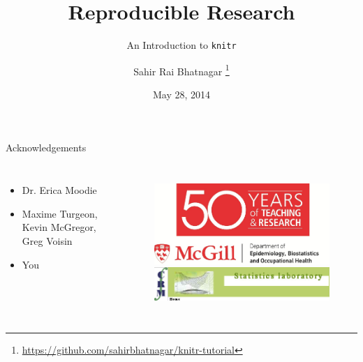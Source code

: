 \documentclass[10pt]{beamer}\usepackage[]{graphicx}\usepackage[]{color}
\begin{document}
\title[RR: Intro to \texttt{knitr}]{Reproducible Research}
\subtitle{An Introduction to \texttt{knitr}}

\author[]{Sahir Rai Bhatnagar%
\thanks{\href{https://github.com/sahirbhatnagar/knitr-tutorial}{https://github.com/sahirbhatnagar/knitr-tutorial}%
}}

\date{May 28, 2014}


\maketitle

\begin{frame}{Acknowledgements}
\begin{columns}[c] %


\begin{itemize}
\item Dr. Erica Moodie
\item Maxime Turgeon, Kevin McGregor, Greg Voisin
\item You
\end{itemize}

\begin{figure}
\includegraphics[width=0.6\columnwidth]{eboh50.pdf}\\[5mm]
\includegraphics[width=1.0\columnwidth]{crm.png}
\end{figure}

\end{columns}
\end{frame}
\end{document}
